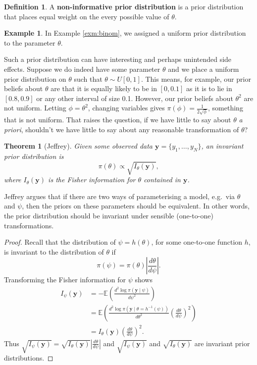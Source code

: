 \documentclass[
]{book}
\newtheorem{theorem}{Theorem}[chapter]
\theoremstyle{definition}
\newtheorem{definition}{Definition}[chapter]
\theoremstyle{definition}
\newtheorem{example}{Example}[chapter]
\theoremstyle{definition}
\theoremstyle{definition}
\theoremstyle{remark}
\begin{document}
\begin{definition}
A \textbf{non-informative prior distribution} is a prior distribution that places equal weight on the every possible value of \(\theta\).
\end{definition}

\begin{example}
In Example \ref{exm:binom}, we assigned a uniform prior distribution to the parameter \(\theta\).
\end{example}

Such a prior distribution can have interesting and perhaps unintended side effects. Suppose we do indeed have some parameter \(\theta\) and we place a uniform prior distribution on \(\theta\) such that \(\theta \sim U[0, 1]\). This means, for example, our prior beliefs about \(\theta\) are that it is equally likely to be in \([0, 0.1]\) as it is to lie in \([0.8, 0.9]\) or any other interval of size 0.1. However, our prior beliefs about \(\theta^2\) are not uniform. Letting \(\phi = \theta^2\), changing variables gives \(\pi(\phi) = \frac{1}{2\sqrt{\phi}}\), something that is not uniform. That raises the question, if we have little to say about \(\theta\) \textit{a priori}, shouldn't we have little to say about any reasonable transformation of \(\theta\)?

\begin{theorem}[Jeffrey]
Given some observed data \(\boldsymbol{y} = \{y_1, \ldots, y_N\}\), an invariant prior distribution is
\[
\pi(\theta) \propto \sqrt{I_\theta(\boldsymbol{y})},
\]
where \(I_\theta(\boldsymbol{y})\) is the Fisher information for \(\theta\) contained in \(\boldsymbol{y}\).
\end{theorem}

Jeffrey argues that if there are two ways of parameterising a model, e.g.~via \(\theta\) and \(\psi\), then the priors on these parameters should be equivalent. In other words, the prior distribution should be invariant under sensible (one-to-one) transformations.

\begin{proof}
Recall that the distribution of \(\psi = h(\theta)\), for some one-to-one function \(h\), is invariant to the distribution of \(\theta\) if
\[
\pi(\psi) = \pi(\theta) \left|\frac{d\theta}{d\psi}\right|.
\]
Transforming the Fisher information for \(\psi\) shows
\begin{align*}
I_\psi(\boldsymbol{y}) &= - \mathbb{E}\left(\frac{d^2\log \pi(\boldsymbol{y} \mid \psi)}{d\psi^2}\right) \\
& = \mathbb{E}\left(\frac{d^2 \log \pi(\boldsymbol{y} \mid \theta = h^{-1}(\psi))}{d\theta^2}\left(\frac{d\theta}{d\psi}\right)^2\right)  \\
& = I_\theta(\boldsymbol{y})\left(\frac{d\theta}{d\psi}\right)^2 .
\end{align*}
Thus \(\sqrt{I_\psi(\boldsymbol{y})} = \sqrt{I_\theta(\boldsymbol{y})} \left|\frac{d\theta}{d\psi}\right|\) and \(\sqrt{I_\psi(\boldsymbol{y})}\) and \(\sqrt{I_\theta(\boldsymbol{y})}\) are invariant prior distributions.
\end{proof}
\end{document}
